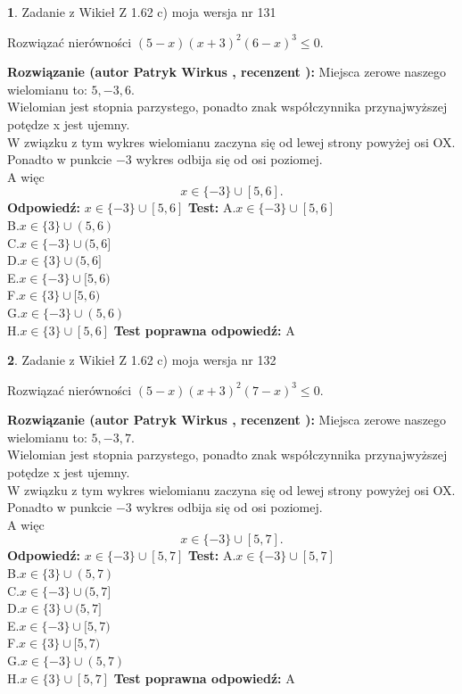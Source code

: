 \documentclass[12pt, a4paper]{article}
\theoremstyle{definition} %
\newtheorem{zad}{}
\newcommand{\zadStart}[1]{\begin{zad}#1\newline}
\newcommand{\zadStop}{\end{zad}}
\newcommand{\rozwStart}[2]{\noindent \textbf{Rozwiązanie (autor #1 , recenzent #2): }\newline}
\newcommand{\rozwStop}{\newline}
\newcommand{\odpStart}{\noindent \textbf{Odpowiedź:}\newline}
\newcommand{\odpStop}{\newline}
\newcommand{\testStart}{\noindent \textbf{Test:}\newline}
\newcommand{\testStop}{\newline}
\newcommand{\kluczStart}{\noindent \textbf{Test poprawna odpowiedź:}\newline}
\newcommand{\kluczStop}{\newline}
\begin{document}
\zadStart{Zadanie z Wikieł Z 1.62 c) moja wersja nr 131}

Rozwiązać nierówności $(5-x)(x+3)^{2}(6-x)^{3}\le0$.
\zadStop
\rozwStart{Patryk Wirkus}{}
Miejsca zerowe naszego wielomianu to: $5, -3, 6$.\\
Wielomian jest stopnia parzystego, ponadto znak współczynnika przy\linebreak najwyższej potędze x jest ujemny.\\ W związku z tym wykres wielomianu zaczyna się od lewej strony powyżej osi OX.\\
Ponadto w punkcie $-3$ wykres odbija się od osi poziomej.\\
A więc $$x \in \{-3\} \cup [5,6].$$
\rozwStop
\odpStart
$x \in \{-3\} \cup [5,6]$
\odpStop
\testStart
A.$x \in \{-3\} \cup [5,6]$\\
B.$x \in \{3\} \cup (5,6)$\\
C.$x \in \{-3\} \cup (5,6]$\\
D.$x \in \{3\} \cup (5,6]$\\
E.$x \in \{-3\} \cup [5,6)$\\
F.$x \in \{3\} \cup [5,6)$\\
G.$x \in \{-3\} \cup (5,6)$\\
H.$x \in \{3\} \cup [5,6]$
\testStop
\kluczStart
A
\kluczStop



\zadStart{Zadanie z Wikieł Z 1.62 c) moja wersja nr 132}

Rozwiązać nierówności $(5-x)(x+3)^{2}(7-x)^{3}\le0$.
\zadStop
\rozwStart{Patryk Wirkus}{}
Miejsca zerowe naszego wielomianu to: $5, -3, 7$.\\
Wielomian jest stopnia parzystego, ponadto znak współczynnika przy\linebreak najwyższej potędze x jest ujemny.\\ W związku z tym wykres wielomianu zaczyna się od lewej strony powyżej osi OX.\\
Ponadto w punkcie $-3$ wykres odbija się od osi poziomej.\\
A więc $$x \in \{-3\} \cup [5,7].$$
\rozwStop
\odpStart
$x \in \{-3\} \cup [5,7]$
\odpStop
\testStart
A.$x \in \{-3\} \cup [5,7]$\\
B.$x \in \{3\} \cup (5,7)$\\
C.$x \in \{-3\} \cup (5,7]$\\
D.$x \in \{3\} \cup (5,7]$\\
E.$x \in \{-3\} \cup [5,7)$\\
F.$x \in \{3\} \cup [5,7)$\\
G.$x \in \{-3\} \cup (5,7)$\\
H.$x \in \{3\} \cup [5,7]$
\testStop
\kluczStart
A
\kluczStop
\end{document}
